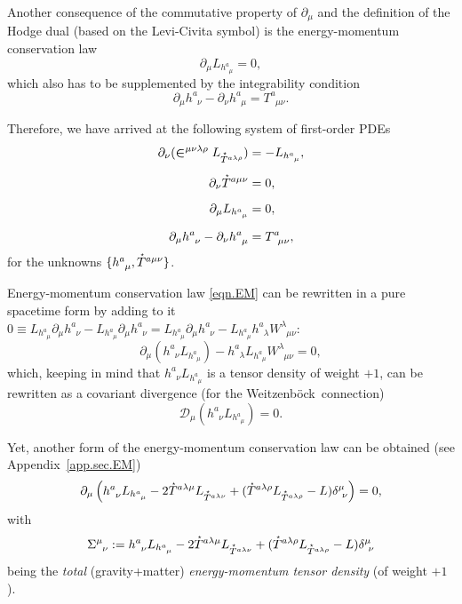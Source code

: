 \documentclass[
10pt, %
a4paper, %
oneside, %
headinclude,footinclude, %
BCOR5mm, %
]{scrartcl}
\newcommand{\pd}[1]{\partial_{#1}}
\newcommand{\tetrsymbol}{h}
\newcommand{\tetr}[2]{\tetrsymbol^{#1}_{\phantom{#1}#2}}
\newcommand{\D}[1]{\partial_{#1}} %
\newcommand{\DW}[1]{\mathcal{D}_{#1}} %
\newcommand{\Tors}[2]{T^{#1}_{\phantom{a}#2}}
\newcommand{\w}[2]{W^{#1}_{\phantom{#1}#2}}
\newcommand{\We}{Weitzenb\"ock}
\newcommand{\Laghodge}{L}%
\newcommand{\EM}[2]{\Sigma^{#1}_{\phantom{#1}#2}}
\newcommand{\LCsymb}{\bm{\in}}    %
\newcommand{\HDT}[1]{\accentset{\star}{T}^{#1}}
\begin{document}
Another consequence of the commutative property of $ \pd{\mu} $ and the definition of the Hodge 
dual (based on the Levi-Civita symbol) is the energy-momentum
conservation law
\begin{equation}\label{eqn.EM}
\D{\mu}\Laghodge_{\tetr{a}{\mu}} = 0,
\end{equation}
which also has to be supplemented by the integrability condition 
\begin{equation}\label{eqn.tetr}
\D{\mu}\tetr{a}{\nu} - \D{\nu}\tetr{a}{\mu} = \Tors{a}{\mu\nu}.
\end{equation}

Therefore, we have arrived at the following system of first-order PDEs 
\begin{subequations}\label{eqn.1st.order.TEGR0}
	\begin{align}	
	\D{\nu}(\LCsymb^{\mu\nu\lambda\rho}\Laghodge_{\HDT{a\lambda\rho}}) 
	&=-\Laghodge_{\tetr{a}{\mu}},\label{eqn.TEGR0.EL}\\[2mm]
	\D{\nu}\HDT{a\mu\nu} & = 0,\label{eqn.TEGR0.integr}\\[2mm]
	\D{\mu}\Laghodge_{\tetr{a}{\mu}} & = 0,\label{eqn.TEGR0.enermomen}\\[2mm]
	\D{\mu}\tetr{a}{\nu} - \D{\nu}\tetr{a}{\mu} &= \Tors{a}{\mu\nu},\label{eqn.TEGR0.tetrad}
	\end{align}
\end{subequations}
for the unknowns $ \{\tetr{a}{\mu},\HDT{a\mu\nu}\} $.

Energy-momentum conservation law \eqref{eqn.EM} can be rewritten in a pure spacetime form by adding 
to it 
$ 
0\equiv \Laghodge_{\tetr{a}{\mu}}\pd{\mu} \tetr{a}{\nu} - \Laghodge_{\tetr{a}{\mu}}\pd{\mu} 
\tetr{a}{\nu}  = \Laghodge_{\tetr{a}{\mu}}\pd{\mu} \tetr{a}{\nu} - \Laghodge_{\tetr{a}{\mu}} 
\tetr{a}{\lambda}\w{\lambda}{\mu\nu} $:
\begin{equation}\label{eqn.EM2}
	\pd{\mu}(\tetr{a}{\nu}L_{\tetr{a}{\mu}}) - \tetr{a}{\lambda}\Laghodge_{\tetr{a}{\mu}} 
	\w{\lambda}{\mu\nu} = 0,
\end{equation}
which, keeping in mind that $ \tetr{a}{\nu}L_{\tetr{a}{\mu}} $ is a tensor density of weight $ +1 
$, can be rewritten as a covariant divergence (for the \We\ connection)
\begin{equation}\label{eqn.EM.cov}
	\DW{\mu}(\tetr{a}{\nu}L_{\tetr{a}{\mu}}) = 0.
\end{equation}

Yet, another form of the energy-momentum conservation law can be obtained (see 
Appendix~\ref{app.sec.EM})
\begin{equation}\label{eqn.EM3}
	\pd{\mu}\left( 
		\tetr{a}{\nu} L_{\tetr{a}{\mu}} - 2 \HDT{a\lambda\mu}L_{\HDT{a\lambda\nu}} + 
		(\HDT{a\lambda\rho}L_{\HDT{a\lambda\rho}} - L) \delta^\mu_{\ \nu}
	\right) = 0,
\end{equation}
with 
\begin{equation}\label{eqn.EM4}
	 \EM{\mu}{\nu} :=
	\tetr{a}{\nu} L_{\tetr{a}{\mu}} - 2 \HDT{a\lambda\mu}L_{\HDT{a\lambda\nu}} + 
	(\HDT{a\lambda\rho}L_{\HDT{a\lambda\rho}} - L) \delta^\mu_{\ \nu}
\end{equation}
being the \emph{total} (gravity+matter) \emph{energy-momentum tensor density} 
(of weight $ +1 $).
\end{document}
